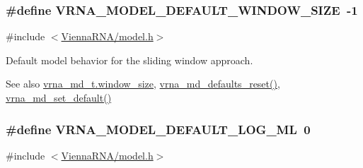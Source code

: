 \subsubsection[{\texorpdfstring{V\+R\+N\+A\+\_\+\+M\+O\+D\+E\+L\+\_\+\+D\+E\+F\+A\+U\+L\+T\+\_\+\+W\+I\+N\+D\+O\+W\+\_\+\+S\+I\+ZE}{VRNA_MODEL_DEFAULT_WINDOW_SIZE}}]{\setlength{\rightskip}{0pt plus 5cm}\#define V\+R\+N\+A\+\_\+\+M\+O\+D\+E\+L\+\_\+\+D\+E\+F\+A\+U\+L\+T\+\_\+\+W\+I\+N\+D\+O\+W\+\_\+\+S\+I\+ZE~-\/1}\hypertarget{group__model__details_ga8de04a9cb57e811e313b0f9f207f6bdb}{}\label{group__model__details_ga8de04a9cb57e811e313b0f9f207f6bdb}


{\ttfamily \#include $<$\hyperlink{model_8h}{Vienna\+R\+N\+A/model.\+h}$>$}



Default model behavior for the sliding window approach. 

\begin{DoxySeeAlso}{See also}
\hyperlink{group__model__details_abea42f9229f8d8d6bcbedef316315bfc}{vrna\+\_\+md\+\_\+t.\+window\+\_\+size}, \hyperlink{group__model__details_ga70834424cf804d149937de89f80ceb45}{vrna\+\_\+md\+\_\+defaults\+\_\+reset()}, \hyperlink{group__model__details_ga8ac6ff84936282436f822644bf841f66}{vrna\+\_\+md\+\_\+set\+\_\+default()} 
\end{DoxySeeAlso}
\subsubsection[{\texorpdfstring{V\+R\+N\+A\+\_\+\+M\+O\+D\+E\+L\+\_\+\+D\+E\+F\+A\+U\+L\+T\+\_\+\+L\+O\+G\+\_\+\+ML}{VRNA_MODEL_DEFAULT_LOG_ML}}]{\setlength{\rightskip}{0pt plus 5cm}\#define V\+R\+N\+A\+\_\+\+M\+O\+D\+E\+L\+\_\+\+D\+E\+F\+A\+U\+L\+T\+\_\+\+L\+O\+G\+\_\+\+ML~0}\hypertarget{group__model__details_ga938f68463e84fe060aa6502f428a517d}{}\label{group__model__details_ga938f68463e84fe060aa6502f428a517d}


{\ttfamily \#include $<$\hyperlink{model_8h}{Vienna\+R\+N\+A/model.\+h}$>$}



